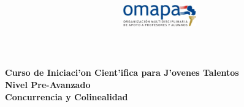\documentclass{article}
\title{
\begin{center}
\includegraphics[width=120px, height=40px]{omapa.jpg}\\
\end{center}
}
\date{}
\begin{document}
\maketitle
\begin{center}
\bfseries{Curso de Iniciaci'on Cient'ifica para J'ovenes Talentos\\
Nivel Pre-Avanzado \\
Concurrencia y Colinealidad}
\end{center}


\end{document}
